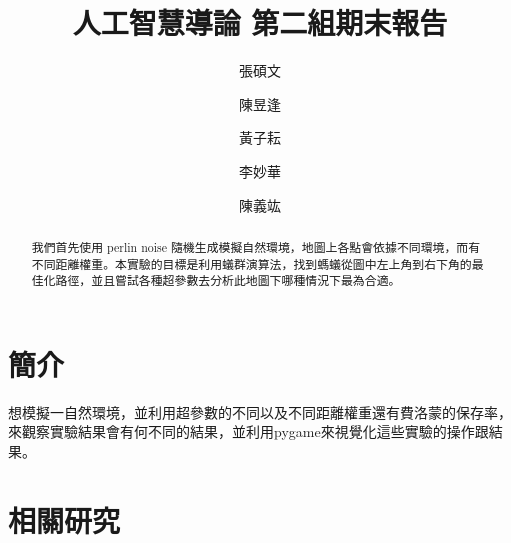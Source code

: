 \documentclass[sigconf]{acmart}
\begin{document}
\renewcommand\thesection{\arabic{section}}

\title{人工智慧導論 第二組期末報告}
\author{張碩文}
\author{陳昱逢}

\author{黃子耘}
\author{李妙華}
\author{陳義竑}



\begin{abstract}
	我們首先使用 perlin noise 隨機生成模擬自然環境，地圖上各點會依據不同環境，而有不同距離權重。本實驗的目標是利用蟻群演算法，找到螞蟻從圖中左上角到右下角的最佳化路徑，並且嘗試各種超參數去分析此地圖下哪種情況下最為合適。

\end{abstract}




\maketitle


  
\section{簡介}
\label{sec:introduction}


	想模擬一自然環境，並利用超參數的不同以及不同距離權重還有費洛蒙的保存率，來觀察實驗結果會有何不同的結果，並利用pygame來視覺化這些實驗的操作跟結果。
 
\iffalse
\begin{figure}[htb]
  \vspace{-\baselineskip}  
  \centering  
    \resizebox{0.35\textwidth}{!}{\texttt{[image: fig/VANET\_communication.pdf]}}
    \caption{Communication types in C-ITS}
    \label{fig:vanet_communication}
  \vspace{-\baselineskip}
\end{figure}	 
\fi
	


\section{相關研究}
\label{sec:related_work}
\end{document}
